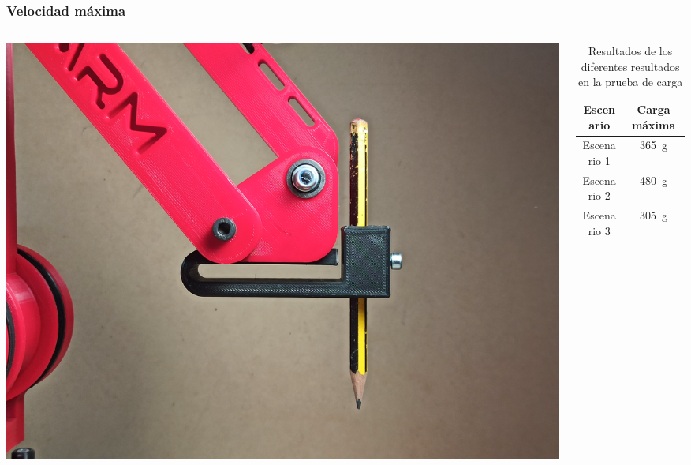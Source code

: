 \documentclass{beamer}
\begin{document}
\begin{frame}
  \frametitle{Velocidad máxima}
  \begin{columns}
    \begin{column}{0.5\textwidth} %
      \includegraphics[width=\textwidth]{figs/pen_tool.jpg}
    \end{column}
    \begin{column}{0.5\textwidth} %
      
      \begin{table}[H]
        \begin{center}
        \begin{tabular}{|c|c|}
        \hline
        \textbf{Escenario} & \textbf{Carga máxima} \\
        \hline
        Escenario 1& \SI{365}{\gram} \\
        Escenario 2 & \SI{480}{\gram} \\
        Escenario 3 & \SI{305}{\gram} \\
        \hline
        \end{tabular}
        \caption{Resultados de los diferentes resultados en la prueba de carga}
        \label{cuadro:evaluacion_carga}
        \end{center}
        \end{table}
    
      \end{column}
  \end{columns}
\end{frame}
\end{document}
